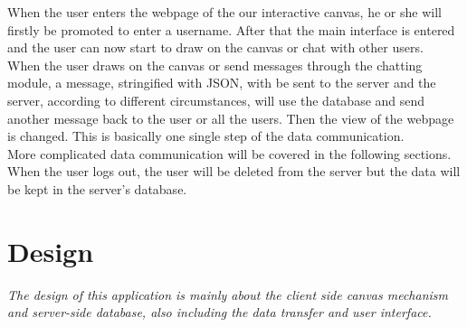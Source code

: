 \documentclass[a4paper,11pt,3p]{article}
\begin{document}
When the user enters the webpage of the our interactive canvas, he or she will 
firstly be promoted to enter a username. After that the main interface is entered 
and the user can now start to draw on the canvas or chat with other users.\\

When the user draws on the canvas or send messages through the chatting module, a 
message, stringified with JSON, with be sent to the server and the server, according 
to different circumstances, will use the database and send another message back to 
the user or all the users. Then the view of the webpage is changed. This is basically 
one single step of the data communication.\\

More complicated data communication will be covered in the following sections.\\

When the user logs out, the user will be deleted from the server but the data will be 
kept in the server's database.\\

\section{Design}

\emph{The design of this application is mainly about the client side canvas mechanism and 
server-side database, also including the data transfer and user interface.}\\
\end{document}
